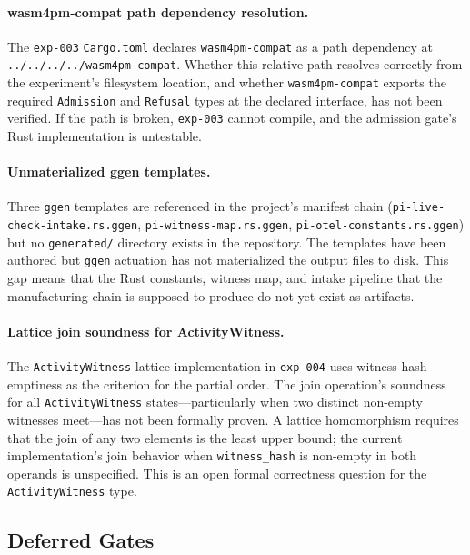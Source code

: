 \paragraph{wasm4pm-compat path dependency resolution.}
The \texttt{exp-003} \texttt{Cargo.toml} declares \texttt{wasm4pm-compat} as a path dependency
at \texttt{../../../../wasm4pm-compat}. Whether this relative path resolves correctly from the
experiment's filesystem location, and whether \texttt{wasm4pm-compat} exports the required
\texttt{Admission} and \texttt{Refusal} types at the declared interface, has not been verified.
If the path is broken, \texttt{exp-003} cannot compile, and the admission gate's Rust
implementation is untestable.

\paragraph{Unmaterialized ggen templates.}
\label{sec:otel-weaver-open-ggen}
Three \texttt{ggen} templates are referenced in the project's manifest chain
(\texttt{pi-live-check-intake.rs.ggen}, \texttt{pi-witness-map.rs.ggen},
\texttt{pi-otel-constants.rs.ggen}) but no \texttt{generated/} directory exists in the
repository. The templates have been authored but \texttt{ggen} actuation has not materialized
the output files to disk. This gap means that the Rust constants, witness map, and intake
pipeline that the manufacturing chain is supposed to produce do not yet exist as artifacts.

\paragraph{Lattice join soundness for ActivityWitness.}
The \texttt{ActivityWitness} lattice implementation in \texttt{exp-004} uses witness hash
emptiness as the criterion for the partial order. The join operation's soundness for all
\texttt{ActivityWitness} states---particularly when two distinct non-empty witnesses meet---has
not been formally proven. A lattice homomorphism requires that the join of any two elements
is the least upper bound; the current implementation's join behavior when
\texttt{witness\_hash} is non-empty in both operands is unspecified. This is an open formal
correctness question for the \texttt{ActivityWitness} type.

\subsection{Deferred Gates}
\label{sec:otel-weaver-deferred-gates}

